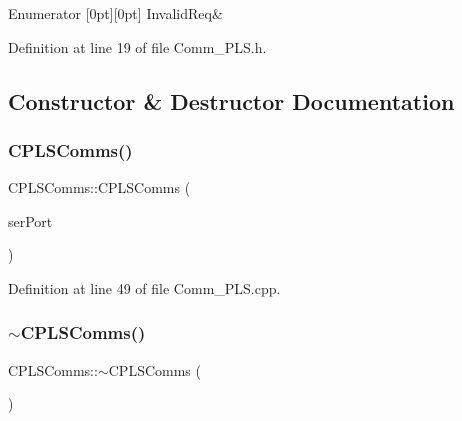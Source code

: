 \begin{DoxyEnumFields}{Enumerator}
[0pt][0pt]{}\mbox{\label{class_c_p_l_s_comms_a765bc36363f75f4faf4fd2b41d440159ada559acd2007e11466d7e8e461f9bd10}} 
Invalid\+Req&\\
\hline

\end{DoxyEnumFields}


Definition at line 19 of file Comm\+\_\+\+P\+L\+S.\+h.



\subsection{Constructor \& Destructor Documentation}
\mbox{\label{class_c_p_l_s_comms_ae1ec975e5e402b405389d47b8acd0a63}} 
\subsubsection{\texorpdfstring{C\+P\+L\+S\+Comms()}{CPLSComms()}}
{\footnotesize\ttfamily C\+P\+L\+S\+Comms\+::\+C\+P\+L\+S\+Comms (\begin{DoxyParamCaption}\item[{\mbox{\hyperlink{class_c_serial}{C\+Serial}} \&}]{ser\+Port }\end{DoxyParamCaption})}



Definition at line 49 of file Comm\+\_\+\+P\+L\+S.\+cpp.

\mbox{\label{class_c_p_l_s_comms_aac23966ff823f63a2ff524bbb706e549}} 
\subsubsection{\texorpdfstring{$\sim$\+C\+P\+L\+S\+Comms()}{~CPLSComms()}}
{\footnotesize\ttfamily C\+P\+L\+S\+Comms\+::$\sim$\+C\+P\+L\+S\+Comms (\begin{DoxyParamCaption}{ }\end{DoxyParamCaption})}




